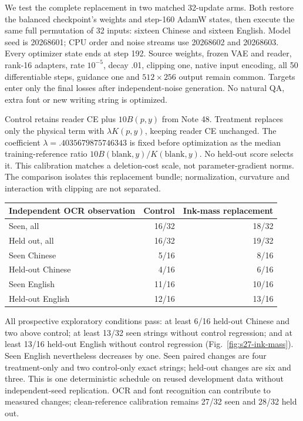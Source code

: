 We test the complete replacement in two matched 32-update arms. Both restore
the balanced checkpoint's weights and step-160 AdamW states, then execute the
same full permutation of 32 inputs: sixteen Chinese and sixteen English.
Model seed is 20268601; CPU order and noise streams use 20268602 and 20268603.
Every optimizer state ends at step 192. Source weights, frozen VAE and reader,
rank-16 adapters, rate $10^{-5}$, decay .01, clipping one, native input encoding,
all 50 differentiable steps, guidance one and $512\times256$ output remain
common. Targets enter only the final losses after independent-noise generation.
No natural QA, extra font or new writing string is optimized.

Control retains reader CE plus $10B(p,y)$ from Note 48. Treatment replaces only
the physical term with $\lambda K(p,y)$, keeping reader CE unchanged.
The coefficient $\lambda=.4035679875746343$ is fixed before optimization as the
median training-reference ratio $10B(\mathrm{blank},y)/K(\mathrm{blank},y)$.
No held-out score selects it. This calibration matches a deletion-cost scale,
not parameter-gradient norms. The comparison isolates this replacement bundle;
normalization, curvature and interaction with clipping are not separated.

\begin{center}\small
\begin{tabular}{lrr}
\toprule
Independent OCR observation & Control & Ink-mass replacement\\
\midrule
Seen, all & 16/32 & 18/32\\
Held out, all & 16/32 & 19/32\\
Seen Chinese & 5/16 & 8/16\\
Held-out Chinese & 4/16 & 6/16\\
Seen English & 11/16 & 10/16\\
Held-out English & 12/16 & 13/16\\
\bottomrule
\end{tabular}
\end{center}

All prospective exploratory conditions pass: at least 6/16 held-out Chinese
and two above control; at least 13/32 seen strings without control regression;
and at least 13/16 held-out English without control regression
(Fig.~\ref{fig:s27-ink-mass}). Seen English nevertheless decreases by one.
Seen paired changes are four treatment-only and two control-only exact strings;
held-out changes are six and three. This is one deterministic schedule on
reused development data without independent-seed replication. OCR and font
recognition can contribute to measured changes; clean-reference calibration
remains 27/32 seen and 28/32 held out.

